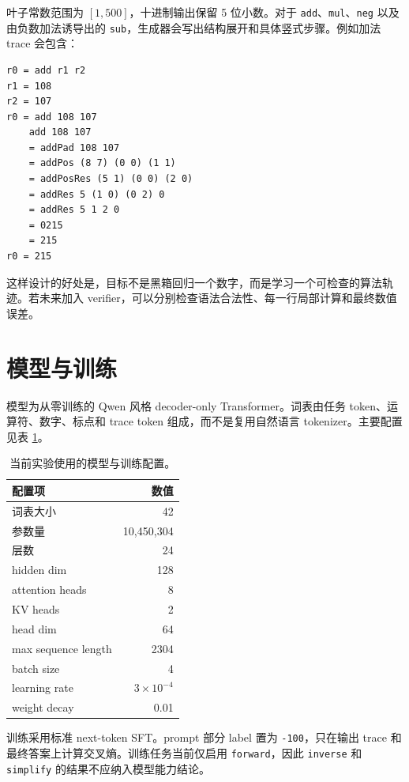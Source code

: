 \documentclass[UTF8,a4paper,11pt]{ctexart}
\begin{document}
叶子常数范围为 $[1,500]$，十进制输出保留 5 位小数。对于 \texttt{add}、\texttt{mul}、\texttt{neg} 以及由负数加法诱导出的 \texttt{sub}，生成器会写出结构展开和具体竖式步骤。例如加法 trace 会包含：

\begin{lstlisting}[style=trace]
r0 = add r1 r2
r1 = 108
r2 = 107
r0 = add 108 107
    add 108 107
    = addPad 108 107
    = addPos (8 7) (0 0) (1 1)
    = addPosRes (5 1) (0 0) (2 0)
    = addRes 5 (1 0) (0 2) 0
    = addRes 5 1 2 0
    = 0215
    = 215
r0 = 215
\end{lstlisting}

这样设计的好处是，目标不是黑箱回归一个数字，而是学习一个可检查的算法轨迹。若未来加入 verifier，可以分别检查语法合法性、每一行局部计算和最终数值误差。

\section{模型与训练}

模型为从零训练的 Qwen 风格 decoder-only Transformer。词表由任务 token、运算符、数字、标点和 trace token 组成，而不是复用自然语言 tokenizer。主要配置见表 \ref{tab:model}。

\begin{table}[h]
\centering
\begin{tabular}{lr}
\toprule
配置项 & 数值 \\
\midrule
词表大小 & 42 \\
参数量 & 10,450,304 \\
层数 & 24 \\
hidden dim & 128 \\
attention heads & 8 \\
KV heads & 2 \\
head dim & 64 \\
max sequence length & 2304 \\
batch size & 4 \\
learning rate & $3\times 10^{-4}$ \\
weight decay & 0.01 \\
\bottomrule
\end{tabular}
\caption{当前实验使用的模型与训练配置。}
\label{tab:model}
\end{table}

训练采用标准 next-token SFT。prompt 部分 label 置为 \texttt{-100}，只在输出 trace 和最终答案上计算交叉熵。训练任务当前仅启用 \texttt{forward}，因此 \texttt{inverse} 和 \texttt{simplify} 的结果不应纳入模型能力结论。
\end{document}
